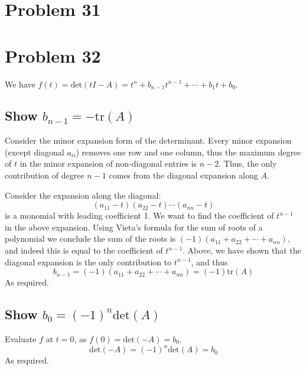 \documentclass{article}[12pt]
\begin{document}
\section{Problem 31}

\section{Problem 32}
We have $f(t) = \textrm{det}(tI-A) = t^n + b_{n-1}t^{n-1} + \cdots + b_1 t + b_0$.
\subsection{Show $b_{n-1} = -\textrm{tr}(A)$}
Consider the minor expansion form of the determinant. Every minor
expansion (except diagonal $a_{ii}$) removes one row and one column, thus
the maximum degree of $t$ in the minor expansion of non-diagonal entries
is $n-2$. Thus, the only contribution of degree $n-1$ comes from the diagonal
expansion along $A$.

Consider the expansion along the diagonal:
\[
(a_{11}-t)(a_{22}-t)\cdots(a_{nn}-t)
\]
is a monomial with leading coefficient 1.
We want to find the coefficient of $t^{n-1}$ in the above expansion.
Using Vieta's formula for the sum of roots of a polynomial we conclude
the sum of the roots is $(-1)(a_{11}+a_{22}+\cdots+a_{nn})$, and indeed
this is equal to the coefficient of $t^{n-1}$. Above, we have shown that
the diagonal expansion is the only contribution to $t^{n-1}$, and thus
\[
b_{n-1} = (-1)(a_{11}+a_{22}+\cdots+a_{nn}) = (-1)\textrm{tr}(A)
\]
As required.

\subsection{Show $b_0 = (-1)^n\textrm{det}(A)$}
Evaluate $f$ at $t=0$, as $f(0) = \textrm{det}(-A) = b_0$.
\[
\textrm{det}(-A) = (-1)^n\textrm{det}(A) = b_0
\]
As required.
\end{document}
